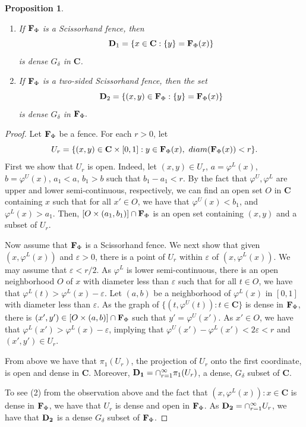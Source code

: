 \documentclass[11pt]{amsart}
\newtheorem{proposition}[theorem]{Proposition}
\newcommand{\cantor}{\mathbf C}
\newcommand{\fence}{{\bf F}_{\Phi}{}}
\begin{document}
{\begin{proposition}
\begin{enumerate}
\item If $\fence$ is a  Scissorhand fence, then \[ {\bf D}_1 =\left \{x \in \cantor: \{y\} = \fence(x)\right \} \] is dense $G_{\delta}$ in $\cantor$.
    \item If $\fence$ is a two-sided Scissorhand fence, then the set \[  {\bf D}_2 = \left \{(x,y) \in \fence: \{y\} = \fence(x)\right \} \] is dense $G_{\delta}$ in $\fence.$
\end{enumerate}
\end{proposition}
\begin{proof}
Let $\fence$ be a fence.
For each $r>0$, let 
    \[U_{r}=\{(x,y) \in \cantor \times [0,1]: y \in \fence(x),\  diam (\fence(x)) < r \}.
    \]
    First we show that $U_r$ is open. Indeed, let $(x,y) \in U_r$, $a = \varphi^L(x)$, $b= \varphi^{U}(x)$, $a_1<a$, $b_1>b$ such that $b_1-a_1<r$. By the fact that $\varphi^U,\varphi^L$ are upper and lower semi-continuous, respectively, we can find an open set $O$ in $\cantor$ containing $x$ such that for all $x' \in O$, we have that $\varphi^U (x)<b_1$, and $\varphi^L(x) >a_1$. Then, $[O \times (a_1, b_1)] \cap \fence$ is an open set containing $(x,y)$ and a subset of $U_r$.
 
    Now assume that $\fence$ is a Scissorhand fence. We next show that given $(x, \varphi^L(x))$ and $\varepsilon >0$, there is a point of $U_r$ within $\varepsilon$ of $(x,\varphi^L(x))$. We may assume that $\varepsilon < r/2$. As $\varphi^L$ is lower semi-continuous, there is an open neighborhood $O$  of $x$ with diameter less than $\varepsilon$ such that  for all $t \in O$, we have that $\varphi^L(t) > \varphi^L(x) - \varepsilon$. Let $(a,b)$ be  a neighborhood of $\varphi^L(x)$ in $[0,1]$ with diameter less than $\varepsilon$.  As the graph of $\{(t,\varphi^U(t)): t \in \cantor\}$ is dense in $\fence$, there is $(x',y') \in [O \times (a,b)] \cap \fence$ such that $y' = \varphi^U(x')$. As $x' \in O$, we have that $\varphi^L(x') >\varphi^L(x) - \varepsilon$, implying that $\varphi^U(x')- \varphi^L(x')< 2 \varepsilon < r$ and $(x',y') \in U_r$.

    From above we have that $ \pi_1(U_r)$, the projection of $U_r$ onto the first coordinate, is open and dense in $\cantor$. Moreover, ${\bf D_1} = \cap_{r=1}^{\infty} \pi_1(U_r)$, a dense, $G_{\delta}$ subset of $\cantor$.

    To see (2) from the observation above and the fact that ${(x,\varphi^L(x)): x \in \cantor}$ is dense in $\fence$, we have that $U_r$ is dense  and open in $\fence$. As ${\bf D_2} = \cap_{r=1}^{\infty} U_r$, we have that ${\bf D_2}$ is a dense $G_{\delta}$ subset of $\fence$.
    

\end{proof}}
\end{document}
